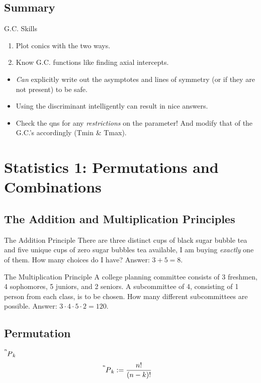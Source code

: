 \documentclass[oneside]{book}
\begin{document}
\section{Summary}
\begin{lbox}[colbacktitle=white, coltitle=black, colframe=black]{G.C. Skills} 
  \begin{enumerate}
    \item Plot conics with the two ways.
    \item Know G.C. functions like finding axial intercepts.
  \end{enumerate}
\end{lbox}
\begin{IN}
  \begin{itemize}[label=-\(\square\)-]
    \item \emph{Can} explicitly write out the asymptotes and lines of symmetry (or if they are not present) to be safe.
    \item Using the discriminant intelligently can result in nice answers.
    \item Check the qns for any \emph{restrictions} on the parameter! And modify that of the G.C.'s accordingly (Tmin \& Tmax).
  \end{itemize}
\end{IN}

\chapter{Statistics 1: Permutations and Combinations}
\section{The Addition and Multiplication Principles}
\begin{example}{The Addition Principle}{}
  There are three distinct cups of black sugar bubble tea and five unique cups of zero sugar bubbles tea available, I am buying \emph{exactly} one of them. How many choices do I have? Answer: \(3+5=8\).
\end{example}
\begin{example}{The Multiplication Principle}{}
  A college planning committee consists of 3 freshmen, 4 sophomores, 5 juniors, and 2 seniors. A subcommittee of 4, consisting of 1 person from each class, is to be chosen. How many different subcommittees are possible. Answer: \(3 \cdot 4 \cdot 5 \cdot 2=120\). 
\end{example}
\section{Permutation}
\begin{definition}{\(\prescript{^n\mkern-2.5mu}{}P_{k}\)}{}
  \[\prescript{^n\mkern-2.5mu}{}P_{k} := \frac{n!}{(n-k)!}\quad\]
\end{definition}
\end{document}
